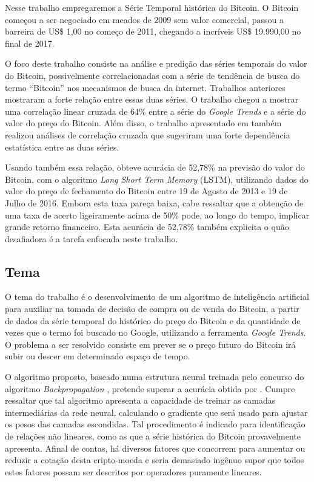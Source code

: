 Nesse trabalho empregaremos a Série Temporal histórica do Bitcoin. O Bitcoin começou a ser negociado em meados de 2009 sem valor comercial, passou a barreira de US\$ 1,00 no começo de 2011, chegando a incríveis US\$ 19.990,00 no final de 2017.

O foco deste trabalho consiste na análise e predição das séries temporais do valor do Bitcoin, possivelmente correlacionadas com a série de tendência de busca do termo ``Bitcoin'' nos mecanismos de busca da internet. Trabalhos anteriores mostraram a forte relação entre essas duas séries. O trabalho \cite{matta2015bitcoin} chegou a mostrar uma  correlação linear cruzada de 64\% entre a série do \textit{Google Trends} e a série do valor do preço do Bitcoin. Além disso, o trabalho apresentado em \cite{wilson_yelowitz_2014} também realizou análises de correlação cruzada que sugeriram uma forte dependência estatística entre as duas séries.

Usando também essa relação, \cite{mcnally2016predicting} obteve acurácia de 52,78\% na previsão do valor do Bitcoin, com o algoritmo \textit{Long Short Term Memory} (LSTM), utilizando dados do valor do preço de fechamento do Bitcoin entre 19 de Agosto de 2013 e 19 de Julho de 2016. Embora esta taxa pareça baixa, cabe ressaltar que a obtenção de uma taxa de acerto ligeiramente acima de 50\% pode, ao longo do tempo, implicar grande retorno financeiro. Esta acurácia de 52,78\% também explicita o quão desafiadora é a tarefa enfocada neste trabalho.


\subsection{Tema}

O tema do trabalho é o desenvolvimento de um algoritmo de inteligência artificial para auxiliar na tomada de decisão de compra ou de venda do Bitcoin, a partir de dados da série temporal do histórico do preço do Bitcoin \cite{nakamoto2008bitcoin} e da quantidade de vezes que o termo foi buscado no Google, utilizando a ferramenta \textit{Google Trends}. O problema a ser resolvido consiste em prever se o preço futuro do Bitcoin irá subir ou descer em determinado espaço de tempo.

O algoritmo proposto, baseado numa estrutura neural treinada pelo concurso do algoritmo \emph{Backpropagation} \cite{hecht1992theory}, pretende superar a acurácia obtida por \cite{mcnally2016predicting}. Cumpre ressaltar que tal algoritmo apresenta a capacidade de treinar as camadas intermediárias da rede neural, calculando o gradiente que será usado para ajustar os pesos das camadas escondidas. Tal procedimento é indicado para identificação de relações não lineares, como as que a série histórica do Bitcoin provavelmente apresenta. Afinal de contas, há diversos fatores que concorrem para aumentar ou reduzir a cotação desta cripto-moeda e seria demasiado ingênuo supor que todos estes fatores possam ser descritos por operadores puramente lineares. 


